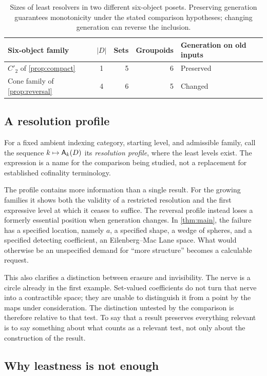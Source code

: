 \begin{table}[htbp]
\centering
\begin{tabular}{@{}lcrrl@{}}
\toprule
Six-object family & $|D|$ & Sets & Groupoids & Generation on old inputs\\
\midrule
$C'_2$ of \cref{prop:compact} & 1 & 5 & 6 & Preserved\\
Cone family of \cref{prop:reversal} & 4 & 6 & 5 & Changed\\
\bottomrule
\end{tabular}
\caption{Sizes of least resolvers in two different six-object posets.
Preserving generation guarantees monotonicity under the stated comparison
hypotheses; changing generation can reverse the inclusion.}
\label{tab:directions}
\end{table}

\subsection{A resolution profile}

For a fixed ambient indexing category, starting level, and admissible family,
call the sequence $k\mapsto\mathsf A_k(D)$ its \emph{resolution profile},
where the least levels exist. The expression is a name for the comparison
being studied, not a replacement for established cofinality terminology.

The profile contains more information than a single result. For the growing
families it shows both the validity of a restricted resolution and the first
expressive level at which it ceases to suffice. The reversal profile instead
loses a formerly essential position when generation changes.
In \cref{thm:main}, the failure has a
specified location, namely $a$, a specified shape, a wedge of spheres,
and a specified detecting coefficient, an Eilenberg--Mac Lane space. What
would otherwise be an unspecified demand for ``more structure'' becomes a
calculable request.

This also clarifies a distinction between erasure and invisibility. The
nerve is a circle already in the first example. Set-valued coefficients do
not turn that nerve into a contractible space; they are unable to distinguish
it from a point by the maps under consideration. The distinction untested by the comparison is
therefore relative to that test. To say that a result preserves everything
relevant is to say something about what counts as a relevant test, not only
about the construction of the result.

\subsection{Why leastness is not enough}

